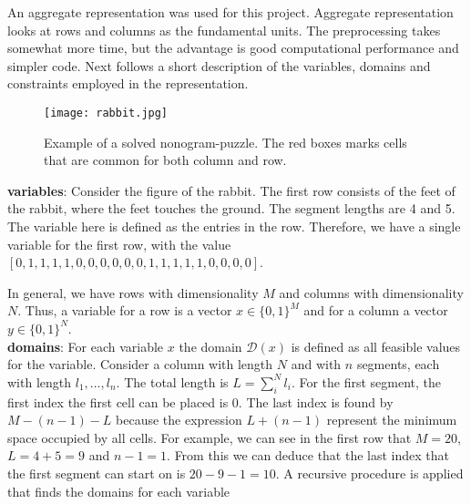 \newenvironment{myitemize} %
{ \begin{itemize}
    \setlength{\itemsep}{0pt}
    \setlength{\parskip}{0pt}
    \setlength{\parsep}{0pt}     }
{ \end{itemize}                  } 

An aggregate representation was used for this project. Aggregate representation
looks at rows and columns as the fundamental units. The preprocessing takes
somewhat more time, but the advantage is good computational performance and
simpler code. Next follows a short description of the variables, domains and
constraints employed in the representation.\\

\begin{figure}[b]
    \centering
    \texttt{[image: rabbit.jpg]}
    \caption{Example of a solved nonogram-puzzle. The red boxes marks cells
    that are common for both column and row.} 
    
\end{figure}

\noindent
\textbf{variables}: Consider the figure of the rabbit. The first row consists of the feet of the rabbit, where the feet touches the ground.
The segment lengths are 4 and 5. The variable here is defined as the entries in the row.
Therefore, we have a single variable for the first row, with the value $[0, 1, 1, 1, 1, 0, 0, 0, 0, 0, 0, 1, 1, 1, 1, 1, 0, 0, 0, 0]$.

In general, we have rows with dimensionality $M$ and columns with dimensionality $N$. Thus, a variable for a row is a vector
$x \in \{0, 1\}^M$ and for a column a vector $y \in \{0, 1\}^N$.\\

\noindent
\textbf{domains}: For each variable $x$ the domain $\mathcal{D}(x)$ is
defined as all feasible values for the variable.  Consider a column with length
$N$ and with $n$ segments, each with length $l_1,\ldots, l_n$. The total
length is $L = \sum_i^N l_i$. For the first segment, the first index the first
cell can be placed is 0.  The last index is found by $M - (n-1) - L$ because the
expression $L + (n-1)$ represent the minimum space occupied by all cells.
For example, we can see in the first row that $M = 20$, $L = 4 + 5 = 9$ and $n-1 = 1$.
From this we can deduce that the last index that the first segment can start on
is $20 - 9 - 1 = 10$. A recursive procedure is applied that finds the domains
for each variable\\

